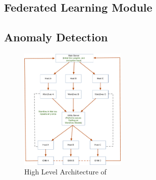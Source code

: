 \subsection{Federated Learning Module}

\subsection{Anomaly Detection}


\begin{figure}[t!]
    \centering
    \includegraphics[width=0.45\textwidth]{fig/arch.pdf}
    \caption{High Level Architecture of \Sys}
    \vspace{-3ex}
    \label{arch}
  \end{figure}
